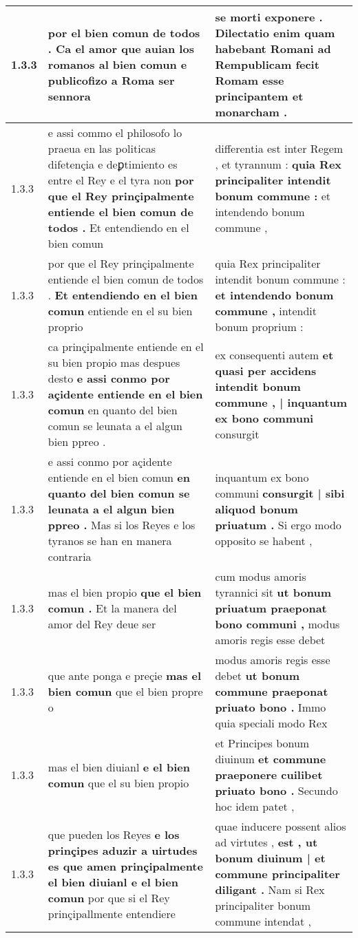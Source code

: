 \begin{tabular}{|p{1cm}|p{6.5cm}|p{6.5cm}|}
1.3.3 & por el bien comun de todos . \textbf{ Ca el amor que auian los romanos al bien comun } e publicofizo a Roma ser sennora & se morti exponere . \textbf{ Dilectatio enim quam habebant Romani } ad Rempublicam fecit Romam esse principantem et monarcham . \\\hline
1.3.3 & e assi commo el philosofo lo praeua en las politicas difetençia e deꝑtimiento es entre el Rey e el tyra non \textbf{ por que el Rey prinçipalmente entiende el bien comun de todos . } Et entendiendo en el bien comun & differentia est inter Regem , et tyrannum : \textbf{ quia Rex principaliter intendit bonum commune : } et intendendo bonum commune , \\\hline
1.3.3 & por que el Rey prinçipalmente entiende el bien comun de todos . \textbf{ Et entendiendo en el bien comun } entiende en el su bien proprio & quia Rex principaliter intendit bonum commune : \textbf{ et intendendo bonum commune , } intendit bonum proprium : \\\hline
1.3.3 & ca prinçipalmente entiende en el su bien propio mas despues desto \textbf{ e assi conmo por açidente entiende en el bien comun } en quanto del bien comun se leunata a el algun bien ppreo . & ex consequenti autem \textbf{ et quasi per accidens intendit bonum commune , | inquantum ex bono communi } consurgit \\\hline
1.3.3 & e assi conmo por açidente entiende en el bien comun \textbf{ en quanto del bien comun se leunata a el algun bien ppreo . } Mas si los Reyes e los tyranos se han en manera contraria & inquantum ex bono communi \textbf{ consurgit | sibi aliquod bonum priuatum . } Si ergo modo opposito se habent , \\\hline
1.3.3 & mas el bien propio \textbf{ que el bien comun . } Et la manera del amor del Rey deue ser & cum modus amoris tyrannici sit \textbf{ ut bonum priuatum praeponat bono communi , } modus amoris regis esse debet \\\hline
1.3.3 & que ante ponga e preçie \textbf{ mas el bien comun } que el bien propre o & modus amoris regis esse debet \textbf{ ut bonum commune praeponat priuato bono . } Immo quia speciali modo Rex \\\hline
1.3.3 & mas el bien diuianl \textbf{ e el bien comun } que el su bien propio & et Principes bonum diuinum \textbf{ et commune praeponere cuilibet priuato bono . } Secundo hoc idem patet , \\\hline
1.3.3 & que pueden los Reyes \textbf{ e los prinçipes aduzir a uirtudes es que amen prinçipalmente el bien diuianl e el bien comun } por que si el Rey prinçipallmente entendiere & quae inducere possent alios ad virtutes , \textbf{ est , ut bonum diuinum | et commune principaliter diligant . } Nam si Rex principaliter bonum commune intendat , \\\hline

\end{tabular}
